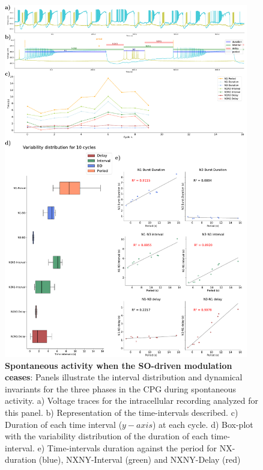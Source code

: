 \begin{figure}[htbp]
	\centering
	\includegraphics[width=0.95\textwidth]{./img/invariants/data/SUSSEX/prep4_so_no_driven/images/panel_with_intervals.pdf}
	\caption{\textbf{Spontaneous activity when the SO-driven modulation ceases}: Panels illustrate the interval distribution and dynamical invariants for the three phases in the CPG during spontaneous activity. a) Voltage traces for the intracellular recording analyzed for this panel. b) Representation of the time-intervals described. c) Duration of each time interval ($y-axis$) at each cycle. d) Box-plot with the variability distribution of the duration of each time-interval. e) Time-intervals duration against the period for NX-duration (blue), NXNY-Interval (green) and NXNY-Delay (red)}
	\label{fig:no so spontaneous invariants}
\end{figure}
 


